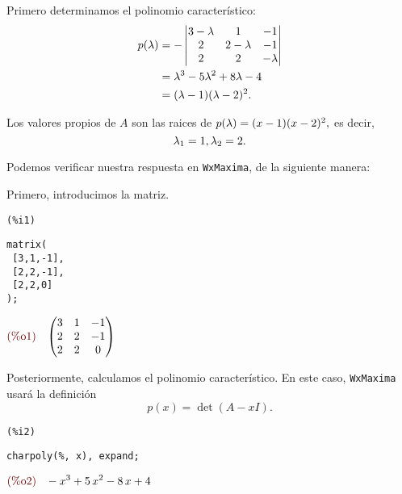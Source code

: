 \begin{sol}
 Primero determinamos el polinomio característico:
\begin{align*}
 p(\lambda)&= -
\begin{vmatrix}
3 - \lambda & 1 & -1 \\
2 & 2 - \lambda & -1 \\
2 & 2 & -\lambda
  \end{vmatrix}\\
  &=\lambda^{3}-5\lambda^{2}+8\lambda-4\\ &=(\lambda-1)(\lambda-2)^{2}.
\end{align*}

Los valores propios de $A$ son las raices de $p(\lambda)=(x-1)(x-2)^{2},$ es decir,
$$
\lambda_{1}=1, \lambda_{2}=2.
$$

Podemos verificar nuestra respuesta en \texttt{WxMaxima}, de la siguiente manera:

Primero, introducimos la matriz.

\noindent
\begin{minipage}[t]{8ex}{\color{red}\bf
\begin{verbatim}
(%i1)
\end{verbatim}}
\end{minipage}
\begin{minipage}[t]{\textwidth}{\color{blue}
\begin{verbatim}
matrix(
 [3,1,-1],
 [2,2,-1],
 [2,2,0]
);
\end{verbatim}}
\end{minipage}
\begin{math}\displaystyle
\parbox{8ex}{\color{labelcolor}(\%o1) }
\begin{pmatrix}3 & 1 & -1\cr 2 & 2 & -1\cr 2 & 2 & 0\end{pmatrix}
\end{math}

Posteriormente, calculamos el polinomio característico. En este caso, \texttt{WxMaxima} usará la definición $$
p(x)=\det\left( A-xI \right).
$$
\noindent
\begin{minipage}[t]{8ex}{\color{red}\bf
\begin{verbatim}
(%i2)
\end{verbatim}}
\end{minipage}
\begin{minipage}[t]{\textwidth}{\color{blue}
\begin{verbatim}
charpoly(%, x), expand;
\end{verbatim}}
\end{minipage}
\begin{math}\displaystyle
\parbox{8ex}{\color{labelcolor}(\%o2) }
-{x}^{3}+5\,{x}^{2}-8\,x+4
\end{math}


\end{sol}
